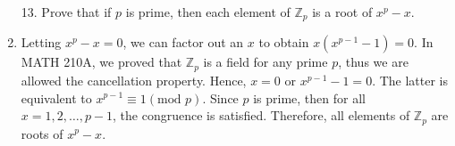 \documentclass[12pt]{article}
\makeatletter
\theoremstyle{definition}
\theoremstyle{remark}
\renewenvironment{proof}[1][\proofname]{\par
  \pushQED{\qed}%
  \normalfont \topsep6\p@\@plus6\p@\relax
  \list{}{\leftmargin=0mm
          \rightmargin=4mm
          \settowidth{\itemindent}{\itshape#1}%
          \labelwidth=\itemindent
          \parsep=0pt \listparindent=\parindent 
  }
  \item[\hskip\labelsep
        \itshape
    #1\@addpunct{.}]\ignorespaces
}{%
  \popQED\endlist\@endpefalse
}
\let\oldproofname=\proofname
\renewcommand{\proofname}{\bf{\textit{\oldproofname}}}
\makeatother
\begin{document}
\begin{enumerate}[leftmargin=*]
        \item[13.] Prove that if $p$ is prime, then each element of $\mathbb{Z}_p$ is a root of $x^p-x$.
            \begin{proof}
                Letting $x^p-x=0$, we can factor out an $x$ to obtain $x(x^{p-1}-1)=0$. In MATH 210A, we proved that $\mathbb{Z}_p$ is a field for any prime $p$, thus we are allowed the cancellation property. Hence, $x=0$ or $x^{p-1}-1=0$. The latter is equivalent to $x^{p-1}\equiv 1(\text{mod }p)$. Since $p$ is prime, then for all $x=1,2,\dots, p-1$, the congruence is satisfied. Therefore, all elements of $\mathbb{Z}_p$ are roots of $x^p-x$. 
            \end{proof}
    \end{enumerate}
    
\end{document}
